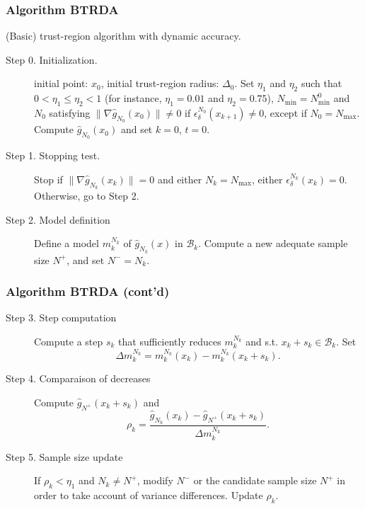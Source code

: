 \documentclass{beamer}
\begin{document}
\begin{frame}
\frametitle{Algorithm BTRDA}

(Basic) trust-region algorithm with dynamic accuracy.

\mbox{}

\begin{description}
\item[Step 0. Initialization.]

initial point: $x_0$, initial trust-region radius: $\Delta_0$.
Set $\eta_1$ and $\eta_2$ such that $0 < \eta_1 \leq
\eta_2 < 1$ (for instance, $\eta_1 = 0.01$ and $\eta_2 = 0.75$),
$N_{\min} = N^0_{\min}$ and %
$N_0$ satisfying $\| \nabla \hat{g}_{N_0} (x_0) \| \ne 0$ if $\epsilon_{\delta}^{N_0}(x_{k+1}) \ne
0$, except if $N_0 = N_{\max}$.
Compute $\hat{g}_{N_0}(x_0)$ and set $k = 0$, $t = 0$.
\item[Step 1. Stopping test.]
Stop if $\| \nabla \hat{g}_{N_{k}}(x_{k})\| = 0$ and either
$N_k = N_{\max}$, either $\epsilon_{\delta}^{N_k}(x_k) = 0$.
Otherwise, go to Step 2.
\item[Step 2. Model definition]
Define a model $m_k^{N_k}$ of $\hat{g}_{N_k}(x)$ in $\mathcal{B}_k$.
Compute a new adequate sample size $N^{+}$, and set $N^- = N_k$.
\end{description}

\end{frame}

\begin{frame}
\frametitle{Algorithm BTRDA (cont'd)}

\begin{description}
\item[Step 3. Step computation]
Compute a step $s_k$ that sufficiently reduces $m_k^{N_k}$ and s.t. $x_k + s_k \in \mathcal{B}_k$.
Set
\[ \Delta m_k^{N_k} = m_k^{N_k}(x_k) - m_k^{N_k}(x_k+s_k). \]
\item[Step 4. Comparaison of decreases]
Compute $\hat{g}_{N^+} (x_k + s_k)$ and %
\[
\rho_k = \frac{\hat{g}_{N_k}(x_k) - \hat{g}_{N^+}(x_k+s_k)}
{\Delta m_k^{N_k}}.
\]
\item[Step 5. Sample size update]
If $\rho_k < \eta_1$ and $N_k \ne N^+$, modify $N^-$ or the candidate sample size $N^+$ in order to take account of variance differences.
Update $\rho_k$.
\end{description}

\end{frame}
\end{document}
